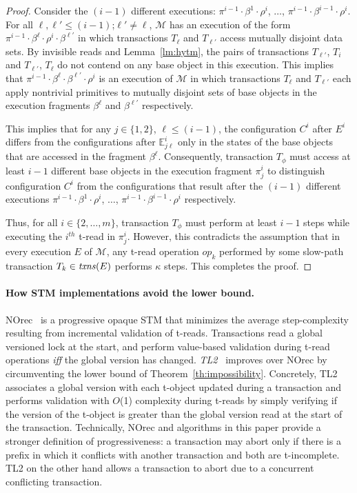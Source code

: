 \begin{proof}
Consider the $(i-1)$ different executions: 
$\pi^{i-1}\cdot\beta^{1}\cdot \rho^i$, $\ldots$, $\pi^{i-1}\cdot\beta^{i-1}\cdot \rho^i$.
For all $\ell, \ell' \leq (i-1)$;$\ell' \neq \ell$, 
$\mathcal{M}$ has an execution of the form $\pi^{i-1}\cdot \beta^{\ell}\cdot \rho^i \cdot \beta^{\ell'}$
in which transactions $T_{\ell}$ and $T_{\ell'}$ access mutually disjoint data sets.
By invisible reads and Lemma~\ref{lm:hytm}, the pairs of transactions $T_{\ell'}$, $T_{i}$ and $T_{\ell'}$, $T_{\ell}$
do not contend on any base object in this execution.
This implies that $\pi^{i-1}\cdot \beta^{\ell} \cdot \beta^{\ell'} \cdot \rho^i$ is an execution of $\mathcal{M}$ in which
transactions $T_{\ell}$ and $T_{\ell'}$ each apply nontrivial primitives
to mutually disjoint sets of base objects in the execution fragments $\beta^{\ell}$ and $\beta^{\ell'}$ respectively.

This implies that for any $j\in \{1,2\}$, $\ell \leq (i-1)$, the configuration $C^i$ after $E^i$ differs from the configurations
after $\mathbb{E}_{j\ell}^{i}$ only in the states of the base objects that are accessed in the fragment $\beta^{\ell}$.
Consequently, transaction $T_{\phi}$ must access at least $i-1$ different base objects
in the execution fragment $\pi_j^i$
to distinguish configuration $C^i$ from the configurations
that result after the $(i-1)$ different executions 
$\pi^{i-1}\cdot\beta^{1}\cdot \rho^i$, $\ldots$, $\pi^{i-1}\cdot\beta^{i-1}\cdot \rho^i$ respectively.

Thus, for all $i \in \{2,\ldots, m\}$, transaction $T_{\phi}$ must perform at least $i-1$ steps 
while executing the $i^{th}$ t-read in $\pi_{j}^i$.
However, this contradicts the assumption that in every execution $E$ of $\mathcal{M}$, any t-read operation $op_k$ performed by some slow-path transaction $T_k \in \ms{txns}(E)$
performs $\kappa$ steps. This completes the proof.
\end{proof}
%
\paragraph{How STM implementations avoid the lower bound.}
NOrec~\cite{norec} is a progressive opaque STM that minimizes the average step-complexity resulting from incremental 
validation of t-reads. Transactions read a global versioned lock at the start, and perform value-based validation
during t-read operations \emph{iff} the global version has changed.
\emph{TL2}~\cite{DSS06} improves over NOrec by circumventing the lower bound
of Theorem~\ref{th:impossibility}. Concretely, TL2 associates a global version with each t-object updated during
a transaction and performs validation with $O$(1) complexity during t-reads by simply verifying if the version
of the t-object is greater than the global version read at the start of the transaction. Technically,
NOrec and algorithms in this paper provide a stronger definition of progressiveness: a transaction may abort
only if there is a prefix in which it conflicts with another transaction and both are t-incomplete. TL2 on the other hand allows
a transaction to abort due to a concurrent conflicting transaction.
%